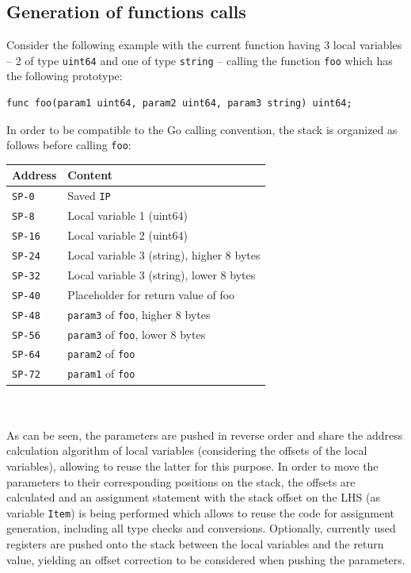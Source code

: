\documentclass[a4paper]{scrartcl}
\let\section\subsection
\let\subsection\subsubsection
\let\subsubsection\paragraph
\let\paragraph\subparagraph
\let\subparagraph\undefined
\begin{document}
    \section{Generation of functions calls} \label{The generation of functions}
      Consider the following example with the current function having 3 local variables -- 2 of type \texttt{uint64} and one of type \texttt{string} -- calling the function \texttt{foo} which has the following prototype:
        \begin{lstlisting}
func foo(param1 uint64, param2 uint64, param3 string) uint64;
        \end{lstlisting}
      In order to be compatible to the Go calling convention, the stack is organized as follows before calling \texttt{foo}:
      \begin{table}[h!]
      \begin{tabular}{ll}
        \toprule
        \textbf{Address} & \textbf{Content}\\
        \midrule
        \texttt{SP-0} & Saved \texttt{IP}\\
        \texttt{SP-8} & Local variable 1 (uint64)\\
        \texttt{SP-16} & Local variable 2 (uint64)\\
        \texttt{SP-24} & Local variable 3 (string), higher 8 bytes\\
        \texttt{SP-32} & Local variable 3 (string), lower 8 bytes\\
        \midrule
        \texttt{SP-40} & Placeholder for return value of foo\\
        \texttt{SP-48} & \texttt{param3} of \texttt {foo}, higher 8 bytes\\
        \texttt{SP-56} & \texttt{param3} of \texttt {foo}, lower 8 bytes\\
        \texttt{SP-64} & \texttt{param2} of \texttt {foo}\\
        \texttt{SP-72} & \texttt{param1} of \texttt {foo}\\
        \bottomrule
      \end{tabular}
      \end{table}\\ \\
      As can be seen, the parameters are pushed in reverse order and share the address calculation algorithm of local variables (considering the offsets of the local variables), allowing to reuse the latter for this purpose. In order to move the parameters to their corresponding positions on the stack, the offsets are calculated and an assignment statement with the stack offset on the LHS (as variable \texttt{Item}) is being performed which allows to reuse the code for assignment generation, including all type checks and conversions. Optionally, currently used registers are pushed onto the stack between the local variables and the return value, yielding an offset correction to be considered when pushing the parameters.\\
\end{document}
